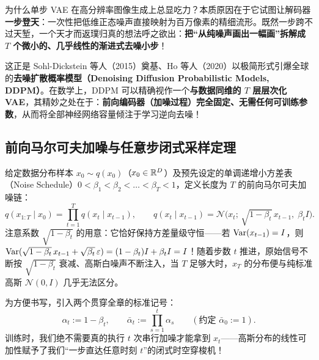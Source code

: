 为什么单步 VAE 在高分辨率图像生成上总显吃力？本质原因在于它试图让解码器\textbf{一步登天}：一次性把低维正态噪声直接映射为百万像素的精细流形。既然一步跨不过天堑，一个天才而返璞归真的想法呼之欲出：\textbf{把“从纯噪声画出一幅画”拆解成 $T$ 个微小的、几乎线性的渐进式去噪小步}！

这正是 Sohl-Dickstein 等人（2015）奠基、Ho 等人（2020）以极简形式引爆全球的\textbf{去噪扩散概率模型（Denoising Diffusion Probabilistic Models, DDPM）}。在数学上，DDPM 可以精确视作一个\textbf{与数据同维的 $T$ 层层次化 VAE}，其精妙之处在于：\textbf{前向编码器（加噪过程）完全固定、无需任何可训练参数}，从而将全部神经网络容量倾注于学习逆向去噪！

\subsection{前向马尔可夫加噪与任意步闭式采样定理}

给定数据分布样本 $x_0 \sim q(x_0)$（$x_0 \in \mathbb{R}^D$）及预先设定的单调递增小方差表（Noise Schedule）$0 < \beta_1 < \beta_2 < \dots < \beta_T < 1$，定义长度为 $T$ 的前向马尔可夫加噪链：
\begin{equation}
  q(x_{1:T} \mid x_0) = \prod_{t=1}^{T} q(x_t \mid x_{t-1}),
  \qquad
  q(x_t \mid x_{t-1}) = \mathcal{N}\!\big(x_t;\, \sqrt{1 - \beta_t}\, x_{t-1},\; \beta_t I\big).
  \label{eq:ddpm-forward-step}
\end{equation}
注意系数 $\sqrt{1 - \beta_t}$ 的用意：它恰好保持方差量级守恒——若 $\operatorname{Var}(x_{t-1}) = I$，则 $\operatorname{Var}(\sqrt{1-\beta_t}\,x_{t-1} + \sqrt{\beta_t}\,\varepsilon) = (1-\beta_t)I + \beta_t I = I$！随着步数 $t$ 推进，原始信号不断按 $\sqrt{1-\beta_t}$ 衰减、高斯白噪声不断注入，当 $T$ 足够大时，$x_T$ 的分布便与纯标准高斯 $\mathcal{N}(0, I)$ 几乎无法区分。

为方便书写，引入两个贯穿全章的标准记号：
\begin{equation}
  \alpha_t := 1 - \beta_t, \qquad \bar{\alpha}_t := \prod_{s=1}^{t} \alpha_s
  \qquad (\text{约定 } \bar{\alpha}_0 := 1).
  \label{eq:ddpm-alpha}
\end{equation}
训练时，我们绝不需要真的执行 $t$ 次串行加噪才能拿到 $x_t$——高斯分布的线性可加性赋予了我们“一步直达任意时刻 $t$”的闭式时空穿梭机！

